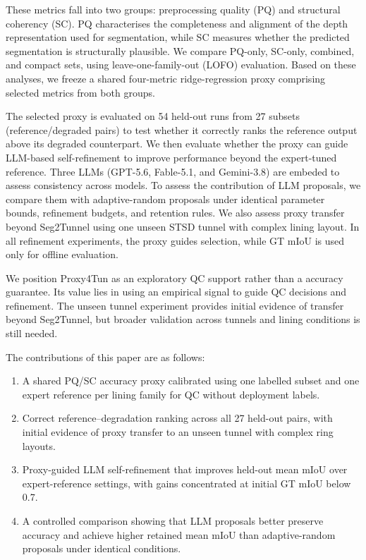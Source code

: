 \documentclass[a4paper,fleqn]{cas-dc}
\begin{document}
These metrics fall into two groups: preprocessing quality (PQ) and structural coherency (SC). PQ characterises the completeness and alignment of the depth representation used for segmentation, while SC measures whether the predicted segmentation is structurally plausible. We compare PQ-only, SC-only, combined, and compact sets, using leave-one-family-out (LOFO) evaluation. Based on these analyses, we freeze a shared four-metric ridge-regression proxy comprising selected metrics from both groups.

The selected proxy is evaluated on 54 held-out runs from 27 subsets (reference/degraded pairs) to test whether it correctly ranks the reference output above its degraded counterpart. We then evaluate whether the proxy can guide LLM-based self-refinement to improve performance beyond the expert-tuned reference. Three LLMs (GPT-5.6, Fable-5.1, and Gemini-3.8) are embeded to assess consistency across models. To assess the contribution of LLM proposals, we compare them with adaptive-random proposals under identical parameter bounds, refinement budgets, and retention rules. We also assess proxy transfer beyond Seg2Tunnel using one unseen STSD tunnel with complex lining layout. In all refinement experiments, the proxy guides selection, while GT mIoU is used only for offline evaluation.

We position Proxy4Tun as an exploratory QC support rather than a accuracy guarantee. Its value lies in using an empirical signal to guide QC decisions and refinement. The unseen tunnel experiment provides initial evidence of transfer beyond Seg2Tunnel, but broader validation across tunnels and lining conditions is still needed.

The contributions of this paper are as follows:
\begin{enumerate}
\item A shared PQ/SC accuracy proxy calibrated using one labelled subset and one expert reference per lining family for QC without deployment labels.

\item Correct reference--degradation ranking across all 27 held-out pairs, with initial evidence of proxy transfer to an unseen tunnel with complex ring layouts.

\item Proxy-guided LLM self-refinement that improves held-out mean mIoU over expert-reference settings, with gains concentrated at initial GT mIoU below 0.7.

\item A controlled comparison showing that LLM proposals better preserve accuracy and achieve higher retained mean mIoU than adaptive-random proposals under identical conditions.
\end{enumerate}
\end{document}
